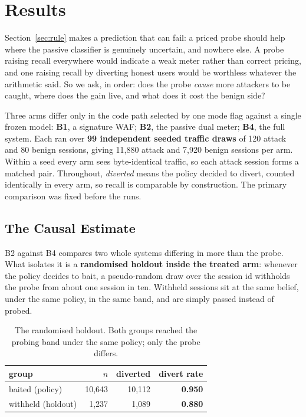 \documentclass[runningheads]{llncs}
\begin{document}
\section{Results}
\label{sec:results}

Section~\ref{sec:rule} makes a prediction that can fail: a priced probe should help
where the passive classifier is genuinely uncertain, and nowhere else. A probe
raising recall everywhere would indicate a weak meter rather than correct pricing,
and one raising recall by diverting honest users would be worthless whatever the
arithmetic said. So we ask, in order: does the probe \emph{cause} more attackers to
be caught, where does the gain live, and what does it cost the benign side?

Three arms differ only in the code path selected by one mode flag against a single
frozen model: \textbf{B1}, a signature WAF; \textbf{B2}, the passive dual meter;
\textbf{B4}, the full system. Each ran over \textbf{99 independent seeded traffic
draws} of 120 attack and 80 benign sessions, giving 11,880 attack and 7,920 benign
sessions per arm. Within a seed every arm sees byte-identical traffic, so each attack
session forms a matched pair. Throughout, \emph{diverted} means the policy decided to
divert, counted identically in every arm, so recall is comparable by construction.
The primary comparison was fixed before the runs.

\subsection{The Causal Estimate}

B2 against B4 compares two whole systems differing in more than the probe. What
isolates it is a \textbf{randomised holdout inside the treated arm}: whenever the
policy decides to bait, a pseudo-random draw over the session id withholds the probe
from about one session in ten. Withheld sessions sit at the same belief, under the
same policy, in the same band, and are simply passed instead of probed.

\begin{table}[t]
\centering
\caption{The randomised holdout. Both groups reached the probing band under the
same policy; only the probe differs.}
\label{tab:holdout}
\begin{tabular}{lrrr}
\toprule
group & $n$ & diverted & divert rate \\
\midrule
baited (policy)     & 10,643 & 10,112 & \textbf{0.950} \\
withheld (holdout)  &  1,237 &  1,089 & \textbf{0.880} \\
\bottomrule
\end{tabular}
\end{table}
\end{document}
